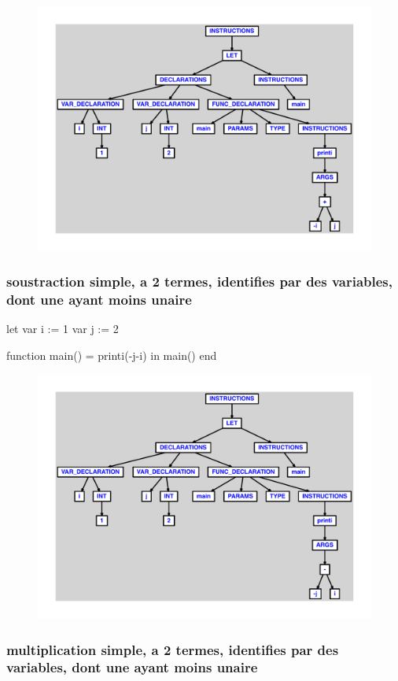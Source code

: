 \documentclass{article}
\begin{document}
\begin{figure}[H]\centering\includegraphics[max width=\textwidth]{ast/ast_75.pdf}\end{figure}\subsubsection{soustraction simple, a 2 termes, identifies par des variables, dont une ayant moins unaire}
\begin{verbatimtab}
let
	var i := 1
	var j := 2

	function main() = printi(-j-i)
in main() end
\end{verbatimtab}
\begin{figure}[H]\centering\includegraphics[max width=\textwidth]{ast/ast_76.pdf}\end{figure}\subsubsection{multiplication simple, a 2 termes, identifies par des variables, dont une ayant moins unaire}
\end{document}

